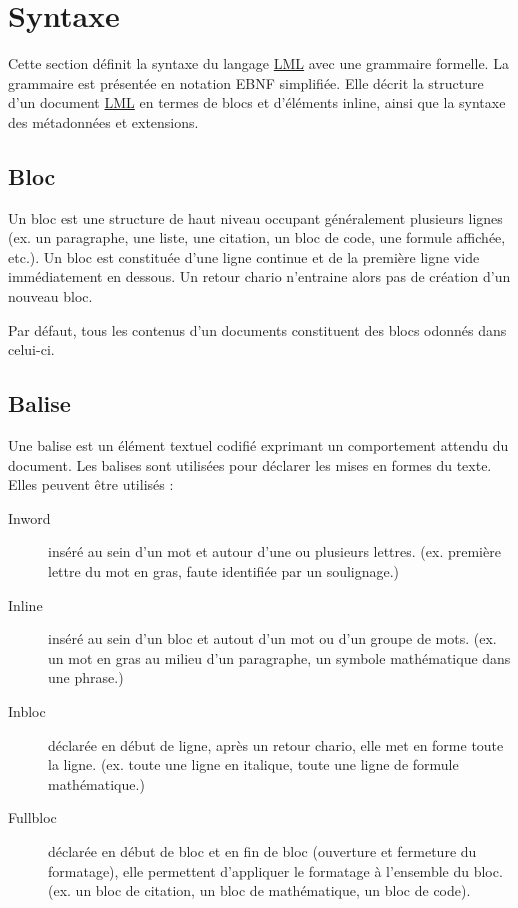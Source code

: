 \documentclass[a4paper,12pt]{article}
\begin{document}
\section{Syntaxe}
\label{sec:org992476f}
Cette section définit la syntaxe du langage \protect\hyperlink{gls-2}{\label{gls-2-use-8}LML} avec une grammaire formelle. La grammaire est présentée en notation EBNF simplifiée. Elle décrit la structure d’un document \protect\hyperlink{gls-2}{\label{gls-2-use-9}LML} en termes de blocs et d’éléments inline, ainsi que la syntaxe des métadonnées et extensions.
\subsection{Bloc}
\label{sec:org88948fe}
Un bloc est une structure de haut niveau occupant généralement plusieurs lignes (ex. un paragraphe, une liste, une citation, un bloc de code, une formule affichée, etc.). Un bloc est constituée d'une ligne continue et de la première ligne vide immédiatement en dessous. Un retour chario n'entraine alors pas de création d'un nouveau bloc.

Par défaut, tous les contenus d'un documents constituent des blocs odonnés dans celui-ci.
\subsection{Balise}
\label{sec:org464110e}
Une balise est un élément textuel codifié exprimant un comportement attendu du document. Les balises sont utilisées pour déclarer les mises en formes du texte. Elles peuvent être utilisés :
\begin{description}
\item[{Inword}] inséré au sein d'un mot et autour d'une ou plusieurs lettres. (ex. première lettre du mot en gras, faute identifiée par un soulignage.)
\item[{Inline}] inséré au sein d’un bloc et autout d'un mot ou d'un groupe de mots. (ex. un mot en gras au milieu d’un paragraphe, un symbole mathématique dans une phrase.)
\item[{Inbloc}] déclarée en début de ligne, après un retour chario, elle met en forme toute la ligne. (ex. toute une ligne en italique, toute une ligne de formule mathématique.)
\item[{Fullbloc}] déclarée en début de bloc et en fin de bloc (ouverture et fermeture du formatage), elle permettent d'appliquer le formatage à l'ensemble du bloc. (ex. un bloc de citation, un bloc de mathématique, un bloc de code).
\end{description}
\end{document}
